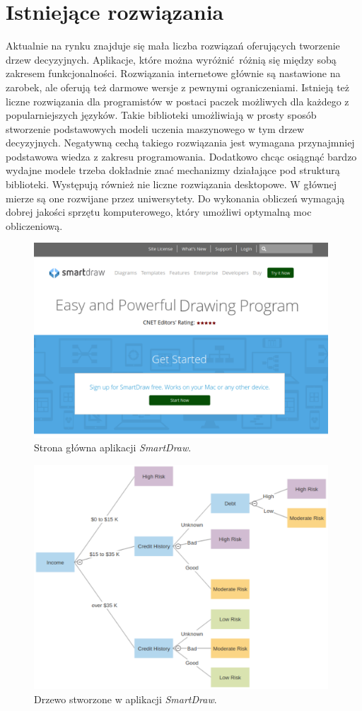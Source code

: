 \section{Istniejące rozwiązania}
Aktualnie na rynku znajduje się mała liczba rozwiązań oferujących tworzenie drzew decyzyjnych. Aplikacje, które można wyróżnić różnią się między sobą zakresem funkcjonalności. Rozwiązania internetowe głównie są nastawione na zarobek, ale oferują też darmowe wersje z pewnymi ograniczeniami. Istnieją też liczne rozwiązania dla programistów w postaci paczek możliwych dla każdego z popularniejszych języków. Takie biblioteki umożliwiają w prosty sposób stworzenie podstawowych modeli uczenia maszynowego w tym drzew decyzyjnych. Negatywną cechą takiego rozwiązania jest wymagana przynajmniej podstawowa wiedza z zakresu programowania. Dodatkowo chcąc osiągnąć bardzo wydajne modele trzeba dokładnie znać mechanizmy działające pod strukturą biblioteki. Występują również nie liczne rozwiązania desktopowe. W głównej mierze są one rozwijane przez uniwersytety. Do wykonania obliczeń wymagają dobrej jakości sprzętu komputerowego, który umożliwi optymalną moc obliczeniową.    

\begin{figure}[htb]
	\centering
	\includegraphics[width=11cm]{grafika/smartdraw.eps}
	\caption{Strona główna aplikacji \textit{SmartDraw}.}
	\label{rys21_smartdraw}
\end{figure}

\begin{figure}[htb]
	\centering
	\includegraphics[width=11cm]{grafika/smartdraw_tree.eps}
	\caption{Drzewo stworzone w aplikacji \textit{SmartDraw}.}
	\label{rys22_smartdraw_tree}
\end{figure}


